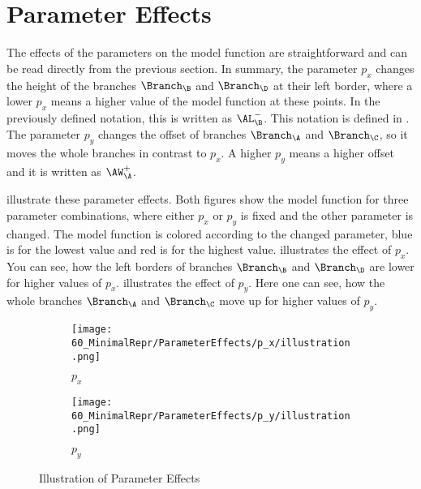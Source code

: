 \section{Parameter Effects}

The effects of the parameters on the model function are straightforward and can be read directly from the previous section.
In summary, the parameter $p_x$ changes the height of the branches $\Branch_\B$ and $\Branch_\D$ at their left border, where a lower $p_x$ means a higher value of the model function at these points.
In the previously defined notation, this is written as $\AL_{\B}^-$.
This notation is defined in .
The parameter $p_y$ changes the offset of branches $\Branch_\A$ and $\Branch_\C$, so it moves the whole branches in contrast to $p_x$.
A higher $p_y$ means a higher offset and it is written as $\AW_{\A}^+$.


 illustrate these parameter effects.
Both figures show the model function for three parameter combinations, where either $p_x$ or $p_y$ is fixed and the other parameter is changed.
The model function is colored according to the changed parameter, blue is for the lowest value and red is for the highest value.
 illustrates the effect of $p_x$.
You can see, how the left borders of branches $\Branch_\B$ and $\Branch_\D$ are lower for higher values of $p_x$.
 illustrates the effect of $p_y$.
Here one can see, how the whole branches $\Branch_\A$ and $\Branch_\C$ move up for higher values of $p_y$.

\begin{figure}
    \centering
    \begin{subfigure}{0.4\textwidth}
        \centering
        \texttt{[image: 60\_MinimalRepr/ParameterEffects/p\_x/illustration.png]}
        \caption{$p_x$}
        \label{fig:final.param.effects.px}
    \end{subfigure}
    \begin{subfigure}{0.4\textwidth}
        \centering
        \texttt{[image: 60\_MinimalRepr/ParameterEffects/p\_y/illustration.png]}
        \caption{$p_y$}
        \label{fig:final.param.effects.py}
    \end{subfigure}
    \caption{Illustration of Parameter Effects}
\end{figure}

